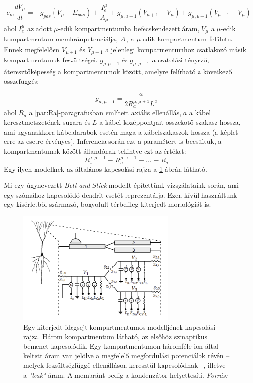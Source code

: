 \begin{equation}\label{eq:multi_comp}
\begin{split}
		c_m\dfrac{dV_\mu}{dt} = -g_{pas}\left(V_\mu - E_{pas}\right) + \dfrac{I_e^\mu}{A_\mu} + g_{\mu,\mu+1}\left(V_{\mu+1}-V_\mu \right) + g_{\mu,\mu-1}\left(V_{\mu-1}-V_\mu \right)
\end{split}
\end{equation}
ahol $I_e^\mu$ az adott $\mu$-edik kompartmentumba befecskendezett áram, $V_\mu$ a $\mu$-edik kompartmentum membránpotenciálja, $A_\mu$ a $\mu$-edik kompartmentum felülete. Ennek megfelelően $V_{\mu+1}$ és $V_{\mu-1}$ a jelenlegi komparmentumhoz csatlakozó másik kompartmentumok feszültségei. $g_{\mu,\mu+1}$ és $g_{\mu,\mu-1}$ a csatolási tényező, áteresztőképesség a kompartmentumok között, amelyre felírható a következő összefüggés:

\begin{equation}\label{eq:Ra}
	g_{\mu,\mu+1} = \dfrac{a}{2 R_a^{\mu,\mu+1} L^2}
\end{equation}
ahol $R_a$ a \ref{par:Ra}-paragrafusban említett axiális ellenállás, $a$ a kábel keresztmetszetének sugara és $L$ a kábel középpontjait összekötő szakasz hossza, ami ugyanakkora kábeldarabok esetén maga a kábelszakaszok hossza (a képlet erre az esetre érvényes). Inferencia során ezt a paramétert is becsültük, a kompartmentumok között állandónak tekintve ezt az értéket: 
\[ R_a^{\mu,\mu-1} = R_a^{\mu,\mu+1} = ... = R_a \]
Egy ilyen modellnek az általános kapcsolási rajza a \ref{fig:multi_comp_model} ábrán látható. 

Mi egy úgynevezett \textit{Ball and Stick} modellt építettünk vizsgálataink során, ami egy szómához kapcsolódó dendrit esetét reprezentálja. Ezen kívül használtunk egy kísérletből származó, bonyolult térbelileg kiterjedt morfológiát is. 

\begin{figure}[h!]
	\centering
	\includegraphics[width=0.7\textwidth]{./fig/multi-comp-model.png}
	\caption[Többkompartmentumos modell]{Egy kiterjedt idegsejt kompartmentumos modelljének kapcsolási rajza. Három kompartmentum látható, az elsőhöz szinaptikus bemenet kapcsolódik. Egy kompartmentumon háromféle ion által keltett áram van jelölve a megfelelő megfordulási potenciálok révén -- melyek feszültségfüggő ellenálláson keresztül kapcsolódnak --, illetve a \textit{"leak"} áram. A membránt pedig a kondenzátor helyettesíti. \textit{Forrás:}\cite{dayan2001theoretical}}
	\label{fig:multi_comp_model}
\end{figure}





